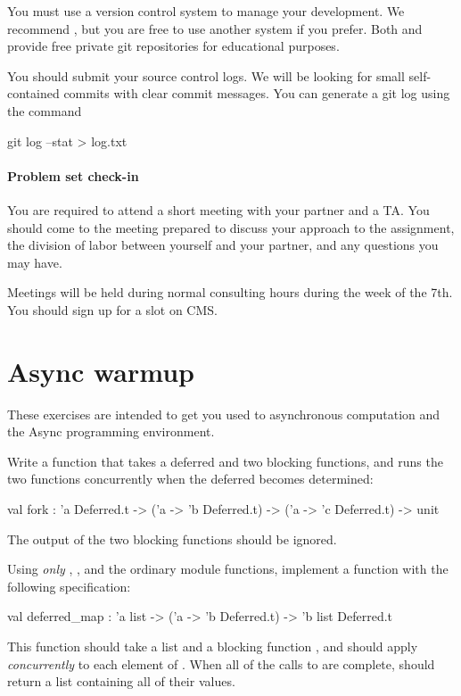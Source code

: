 \documentclass{pset}
\begin{document}
You must use a version control system to manage your development.  We
recommend , but you are free to use another system if you prefer.
Both  and
 provide free private git repositories
for educational purposes.

You should submit your source control logs.  We will be looking for small
self-contained commits with clear commit messages.  You can generate a git log
using the command
\begin{ocaml}
git log --stat > log.txt
\end{ocaml}

\subsection*{Problem set check-in}

You are required to attend a short meeting with your partner and a TA.  You
should come to the meeting prepared to discuss your approach to the assignment,
the division of labor between yourself and your partner, and any questions you
may have.

Meetings will be held during normal consulting hours during the week of the
7th.  You should sign up for a slot on CMS.

\newpage{}

\part{Async warmup}
\label{part:warmup}
These exercises are intended to get you used to asynchronous computation and
the Async programming environment.

\exercise{}

Write  a function  that takes a deferred and two blocking functions,
and runs the two functions concurrently when the deferred becomes determined:

\begin{ocaml}
val fork : 'a Deferred.t -> ('a -> 'b Deferred.t)
                         -> ('a -> 'c Deferred.t) -> unit
\end{ocaml}

The output of the two blocking functions should be ignored.

\exercise{}
Using \emph{only} \code{(>>=)}, , and the ordinary 
module functions, implement a function with the following specification:
\begin{ocaml}
val deferred_map : 'a list -> ('a -> 'b Deferred.t) -> 'b list Deferred.t
\end{ocaml}
This function should take a list  and a blocking function , and
should apply  \emph{concurrently} to each element of .  When
all of the calls to  are complete,  should return a
list containing all of their values.
\end{document}
